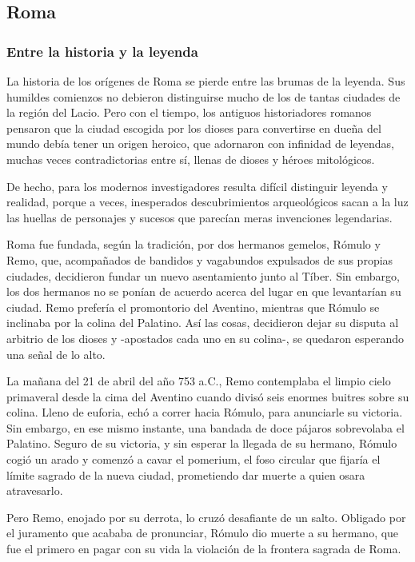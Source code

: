 \documentclass[nochap]{apuntesURJC}
\begin{document}
\subsection{Roma}
\subsubsection{Entre la historia y la leyenda}
La historia de los orígenes de Roma se pierde entre las brumas de la leyenda. Sus humildes comienzos no debieron distinguirse mucho de los de tantas ciudades de la región del Lacio. Pero con el tiempo, los antiguos historiadores romanos pensaron que la ciudad escogida por los dioses para convertirse en dueña del mundo debía tener un origen heroico, que adornaron con infinidad de leyendas, muchas veces contradictorias entre sí, llenas de dioses y héroes mitológicos.

De hecho, para los modernos investigadores resulta difícil distinguir leyenda y realidad, porque a veces, inesperados descubrimientos arqueológicos sacan a la luz las huellas de personajes y sucesos que parecían meras invenciones legendarias.

Roma fue fundada, según la tradición, por dos hermanos gemelos, Rómulo y Remo, que, acompañados de bandidos y vagabundos expulsados de sus propias ciudades, decidieron fundar un nuevo asentamiento junto al Tíber. Sin embargo, los dos hermanos no se ponían de acuerdo acerca del lugar en que levantarían su ciudad. Remo prefería el promontorio del Aventino, mientras que Rómulo se inclinaba por la colina del Palatino. Así las cosas, decidieron dejar su disputa al arbitrio de los dioses y -apostados cada uno en su colina-, se quedaron esperando una señal de lo alto.

La mañana del 21 de abril del año 753 a.C., Remo contemplaba el limpio cielo primaveral desde la cima del Aventino cuando divisó seis enormes buitres sobre su colina. Lleno de euforia, echó a correr hacia Rómulo, para anunciarle su victoria. Sin embargo, en ese mismo instante, una bandada de doce pájaros sobrevolaba el Palatino. Seguro de su victoria, y sin esperar la llegada de su hermano, Rómulo cogió un arado y comenzó a cavar el pomerium, el foso circular que fijaría el límite sagrado de la nueva ciudad, prometiendo dar muerte a quien osara atravesarlo.

Pero Remo, enojado por su derrota, lo cruzó desafiante de un salto. Obligado por el juramento que acababa de pronunciar, Rómulo dio muerte a su hermano, que fue el primero en pagar con su vida la violación de la frontera sagrada de Roma.
\end{document}
